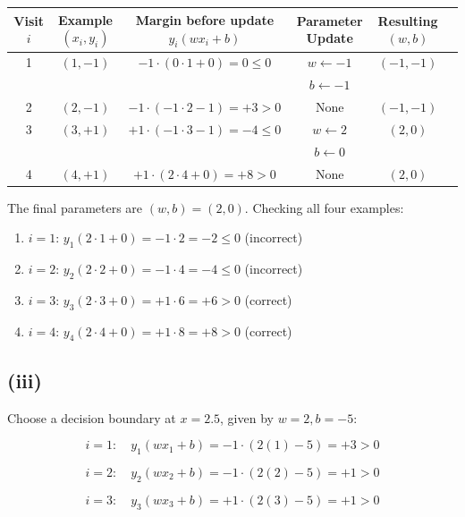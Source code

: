 \documentclass[11pt]{article}
\begin{document}
\begin{center}
\begin{tabular}{cccccc}
\toprule
Visit $i$ & Example $(x_i, y_i)$ & Margin before update $y_i(wx_i + b)$ & Parameter Update & Resulting $(w, b)$ \\
\midrule
1 & $(1, -1)$ & $-1 \cdot (0 \cdot 1 + 0) = 0 \le 0$  & $w \leftarrow -1$ & $(-1, -1)$ \\
  &          &                                     & $b \leftarrow -1$     &   &        \\
2 & $(2, -1)$ & $-1 \cdot (-1 \cdot 2 - 1) = +3 > 0$  & None                             & $(-1, -1)$ \\
3 & $(3, +1)$ & $+1 \cdot (-1 \cdot 3 - 1) = -4 \le 0$ & $w \leftarrow 2$  & $(2, 0)$   \\
  &          &                                      & $b \leftarrow 0$ &         &           \\
4 & $(4, +1)$ & $+1 \cdot (2 \cdot 4 + 0) = +8 > 0$    & None                             & $(2, 0)$   \\
\bottomrule
\end{tabular}
\end{center}

The final parameters are $(w, b) = (2, 0)$. Checking all four examples:

\begin{enumerate}
    \item $i=1$: $y_1(2 \cdot 1 + 0) = -1 \cdot 2 = -2 \le 0$ (incorrect)
    \item $i=2$: $y_2(2 \cdot 2 + 0) = -1 \cdot 4 = -4 \le 0$ (incorrect)
    \item $i=3$: $y_3(2 \cdot 3 + 0) = +1 \cdot 6 = +6 > 0$ (correct)
    \item $i=4$: $y_4(2 \cdot 4 + 0) = +1 \cdot 8 = +8 > 0$ (correct)
\end{enumerate}

\subsection*{(iii)}

Choose a decision boundary at $x = 2.5$, given by $w = 2, b = -5$:

$$
i=1: \quad y_1(w x_1 + b) = -1 \cdot (2(1) - 5) = +3 > 0
$$

$$
i=2: \quad y_2(w x_2 + b) = -1 \cdot (2(2) - 5) = +1 > 0
$$

$$
i=3: \quad y_3(w x_3 + b) = +1 \cdot (2(3) - 5) = +1 > 0
$$
\end{document}
